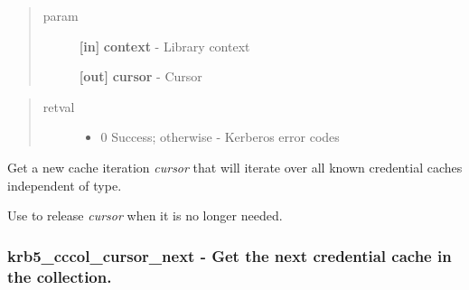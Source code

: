 \documentclass[letterpaper,10pt,english]{sphinxmanual}
\begin{document}
\begin{quote}\begin{description}
\item[{param}] \leavevmode
\textbf{{[}in{]}} \textbf{context} - Library context

\textbf{{[}out{]}} \textbf{cursor} - Cursor

\end{description}\end{quote}
\begin{quote}\begin{description}
\item[{retval}] \leavevmode\begin{itemize}
\item {} 
0   Success; otherwise - Kerberos error codes

\end{itemize}

\end{description}\end{quote}

Get a new cache iteration \emph{cursor} that will iterate over all known credential caches independent of type.

Use {\hyperref[appdev/refs/api/krb5_cccol_cursor_free:krb5_cccol_cursor_free]{}} to release \emph{cursor} when it is no longer needed.




{\hyperref[appdev/refs/api/krb5_cccol_cursor_next:krb5_cccol_cursor_next]{}}




\subsubsection{krb5\_cccol\_cursor\_next -  Get the next credential cache in the collection.}
\label{appdev/refs/api/krb5_cccol_cursor_next::doc}\label{appdev/refs/api/krb5_cccol_cursor_next:krb5-cccol-cursor-next-get-the-next-credential-cache-in-the-collection}

\begin{fulllineitems}
\label{appdev/refs/api/krb5_cccol_cursor_next:krb5_cccol_cursor_next}
\end{fulllineitems}
\end{document}
